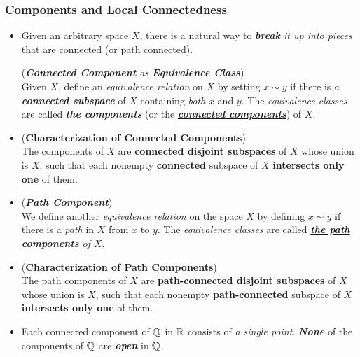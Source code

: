 \documentclass[11pt]{article}
\begin{document}
\subsubsection{Components and Local Connectedness}
\begin{itemize}
\item Given an arbitrary space $X$, there is a natural way to \emph{\textbf{break} it up into pieces} that are connected (or path connected). 
\begin{definition} (\emph{\textbf{Connected Component} as \textbf{Equivalence Class}})\\
Given $X$, define an \emph{equivalence relation} on $X$ by setting $x \sim y$ if there is \emph{a \textbf{connected subspace}} of $X$ containing \emph{both} $x$ and $y$. The \emph{equivalence classes} are called \emph{\textbf{the components}} (or the \underline{\emph{\textbf{connected components}}}) of $X$.
\end{definition}

\item \begin{proposition} (\textbf{Characterization of Connected Components})\\
The components of $X$ are \textbf{connected disjoint subspaces} of $X$ whose union is $X$, such that each nonempty \textbf{connected} subspace of $X$ \textbf{intersects only one} of them.
\end{proposition}

\item \begin{definition}(\emph{\textbf{Path Component}})\\
We define another \emph{equivalence relation} on the space $X$ by defining $x \sim y$ if there is a \emph{path} in $X$ from $x$ to $y$. The \emph{equivalence classes} are called \emph{\underline{\textbf{the path components}} of $X$}.
\end{definition}

\item \begin{proposition} (\textbf{Characterization of Path Components})\\
The path components of $X$ are \textbf{path-connected disjoint subspaces} of $X$ whose union is $X$, such that each nonempty \textbf{path-connected} subspace of $X$ \textbf{intersects only one} of them.
\end{proposition}

\item \begin{example}
Each connected component of ${\mathbb Q}$ in ${\mathbb R}$ consists of \emph{a single point}. \emph{\textbf{None}} of the components of ${\mathbb Q}$ are \emph{\textbf{open}} in ${\mathbb Q}$. 
\end{example}


\end{itemize}
\end{document}
